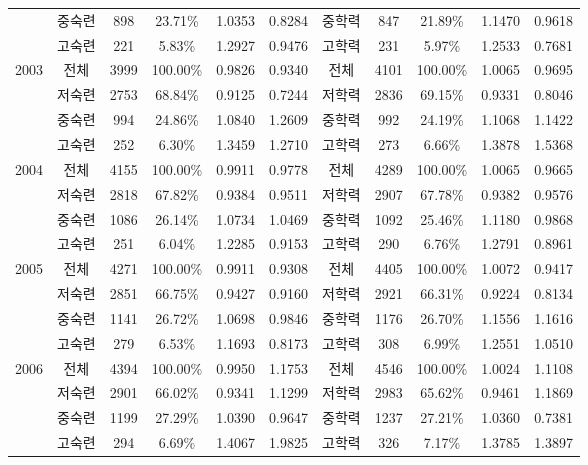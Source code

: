 {\begin{longtable}[htbp]{c|ccccc|ccccc}
    & 중숙련   & 898   & 23.71\% & 1.0353 & 0.8284 & 중학력   & 847   & 21.89\% & 1.1470 & 0.9618  \\
    & 고숙련   & 221   & 5.83\% & 1.2927 & 0.9476 &  고학력   & 231   & 5.97\% & 1.2533 & 0.7681  \\
    \hline \multirow[t]{4}{*}{2003}  & 전체    & 3999  & 100.00\% & 0.9826 & 0.9340  & 전체    & 4101  & 100.00\% & 1.0065 & 0.9695  \\
    & 저숙련   & 2753  & 68.84\% & 0.9125 & 0.7244 & 저학력   & 2836  & 69.15\% & 0.9331 & 0.8046  \\
    & 중숙련   & 994   & 24.86\% & 1.0840 & 1.2609 & 중학력   & 992   & 24.19\% & 1.1068 & 1.1422  \\
    & 고숙련   & 252   & 6.30\% & 1.3459 & 1.2710 &  고학력   & 273   & 6.66\% & 1.3878 & 1.5368  \\
    \hline \multirow[t]{4}{*}{2004}  & 전체    & 4155  & 100.00\% & 0.9911 & 0.9778  & 전체    & 4289  & 100.00\% & 1.0065 & 0.9665  \\
    & 저숙련   & 2818  & 67.82\% & 0.9384 & 0.9511 & 저학력   & 2907  & 67.78\% & 0.9382 & 0.9576  \\
    & 중숙련   & 1086  & 26.14\% & 1.0734 & 1.0469 & 중학력   & 1092  & 25.46\% & 1.1180 & 0.9868  \\
    & 고숙련   & 251   & 6.04\% & 1.2285 & 0.9153 & 고학력   & 290   & 6.76\% & 1.2791 & 0.8961  \\
    \hline \multirow[t]{4}{*}{2005}  & 전체    & 4271  & 100.00\% & 0.9911 & 0.9308  & 전체    & 4405  & 100.00\% & 1.0072 & 0.9417  \\
    & 저숙련   & 2851  & 66.75\% & 0.9427 & 0.9160 & 저학력   & 2921  & 66.31\% & 0.9224 & 0.8134  \\
    & 중숙련   & 1141  & 26.72\% & 1.0698 & 0.9846 & 중학력   & 1176  & 26.70\% & 1.1556 & 1.1616  \\
    & 고숙련   & 279   & 6.53\% & 1.1693 & 0.8173 & 고학력   & 308   & 6.99\% & 1.2551 & 1.0510  \\
    \hline \multirow[t]{4}{*}{2006}  & 전체    & 4394  & 100.00\% & 0.9950 & 1.1753  & 전체    & 4546  & 100.00\% & 1.0024 & 1.1108  \\
    & 저숙련   & 2901  & 66.02\% & 0.9341 & 1.1299 & 저학력   & 2983  & 65.62\% & 0.9461 & 1.1869  \\
    & 중숙련   & 1199  & 27.29\% & 1.0390 & 0.9647 & 중학력   & 1237  & 27.21\% & 1.0360 & 0.7381  \\
    & 고숙련   & 294   & 6.69\% & 1.4067 & 1.9825 &  고학력   & 326   & 7.17\% & 1.3785 & 1.3897  \\

\end{longtable}}

